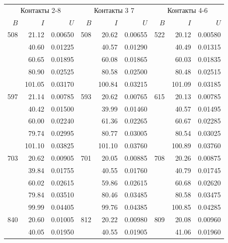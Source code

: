 \documentclass{article}
\begin{document}
\begin{table}[h]
\begin{center}
\begin{tabular}{rrr rrr rrr}
\toprule
\multicolumn{3}{c}{Контакты 2-8} & \multicolumn{3}{c}{Контакты 3 7} & \multicolumn{3}{c}{Контакты 4-6} \\
$B$  &  $I$   &  $U$     & $B$  &   $I$   &  $U$     & $B$  &   $I$   &  $U$     \\\midrule
508  &  21.12 &  0.00650 & 508  &   20.62 &  0.00655 & 522  &   20.12 &  0.00580 \\
     &  40.60 &  0.01225 &      &   40.57 &  0.01290 &      &   40.49 &  0.01315 \\
     &  60.65 &  0.01895 &      &   60.08 &  0.01865 &      &   60.03 &  0.01835 \\
     &  80.90 &  0.02525 &      &   80.58 &  0.02500 &      &   80.48 &  0.02515 \\
     & 101.05 &  0.03170 &      &  100.84 &  0.03215 &      &  101.09 &  0.03185 \\\midrule
597  &  21.14 &  0.00785 & 593  &   20.62 &  0.00765 & 615  &   20.13 &  0.00785 \\
     &  40.42 &  0.01500 &      &   39.99 &  0.01460 &      &   40.57 &  0.01495 \\
     &  60.00 &  0.02240 &      &   61.36 &  0.02265 &      &   60.67 &  0.02285 \\
     &  79.74 &  0.02995 &      &   80.77 &  0.03005 &      &   80.54 &  0.03025 \\
     & 101.10 &  0.03825 &      &  101.10 &  0.03760 &      &  100.89 &  0.03760 \\\midrule
703  &  20.62 &  0.00905 & 701  &   20.05 &  0.00885 & 708  &   20.26 &  0.00875 \\
     &  39.84 &  0.01755 &      &   40.55 &  0.01760 &      &   40.79 &  0.01745 \\
     &  60.02 &  0.02615 &      &   59.86 &  0.02615 &      &   60.68 &  0.02620 \\
     &  79.84 &  0.03510 &      &   80.46 &  0.03485 &      &   80.58 &  0.03475 \\
     &  99.99 &  0.04405 &      &   99.76 &  0.04385 &      &  100.85 &  0.04285 \\\midrule
840  &  20.60 &  0.01005 & 812  &   20.22 &  0.00980 & 809  &   20.08 &  0.00960 \\
     &  40.05 &  0.01950 &      &   40.55 &  0.01905 &      &   41.06 &  0.01960 \\

\end{tabular}
\end{center}
\end{table}
\end{document}
